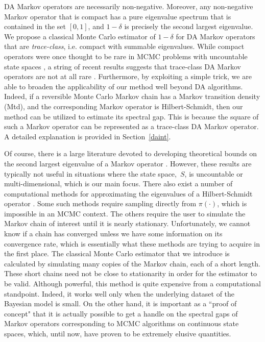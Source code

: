 \documentclass[11pt]{article}
\begin{document}
        DA Markov operators are necessarily non-negative.  Moreover,
        any non-negative Markov operator that is compact has a pure
        eigenvalue spectrum that is contained in the set $[0,1]$, and
        $1-\delta$ is precisely the second largest eigenvalue.  We
        propose a classical Monte Carlo estimator of $1-\delta$ for DA
        Markov operators that are \textit{trace-class}, i.e. compact
        with summable eigenvalues.  While compact operators were once
        thought to be rare in MCMC problems with uncountable state
        spaces \citep{chan1994discussion}, a string of recent results
        suggests that trace-class DA Markov operators are not at all
        rare \citep[see
        e.g.][]{qin2018trace,chakraborty2016convergence,choi2017anova,pal2017trace}.
        Furthermore, by exploiting a simple trick, we are able to
        broaden the applicability of our method well beyond DA
        algorithms.  Indeed, if a reversible Monte Carlo Markov chain
        has a Markov transition density (Mtd), and the corresponding
        Markov operator is Hilbert-Schmidt, then our method can be
        utilized to estimate its spectral gap.  This is because the
        square of such a Markov operator can be represented as a
        trace-class DA Markov operator.  A detailed explanation is
        provided in Section~\ref{daint}.

	Of course, there is a large literature devoted to developing
        theoretical bounds on the second largest eigenvalue of a
        Markov operator \citep[see e.g.][]{lawler1988bounds,
          sinclair1989approximate, diaconis1991geometric}. However,
        these results are typically not useful in situations where the
        state space,~$S$, is uncountable or multi-dimensional, which
        is our main focus. 
        There also exist a number of computational methods for
        approximating the eigenvalues of a Hilbert-Schmidt operator
        \citep[see e.g.][]{garren2000estimating,koltchinskii2000random,ahues2001spectral,chakraborty2017consistent}.
        Some such methods require sampling directly from $\pi(\cdot)$, which is
        impossible in an MCMC context.  
        The others require the user to simulate
        the Markov chain of interest until it is nearly stationary.
        Unfortunately, we cannot know if a chain has converged unless we have
        some information on its convergence rate, which is essentially what
        these methods are trying to acquire in the first place.  
        The classical
        Monte Carlo estimator that we introduce is calculated by simulating many
        copies of the Markov chain, each of a short length. These short chains need not be close to stationarity in order for the
        estimator to be valid.  
        Although powerful, this method is quite expensive from a
        computational standpoint. 
        Indeed, it works well only when the
        underlying dataset of the Bayesian model is small.  
        On the other hand,
        it is important as a ``proof of concept" that it is actually
        possible to get a handle on the spectral gaps of Markov operators
        corresponding to MCMC algorithms on continuous state spaces, which,
        until now, have proven to be extremely elusive quantities.
        
\end{document}
